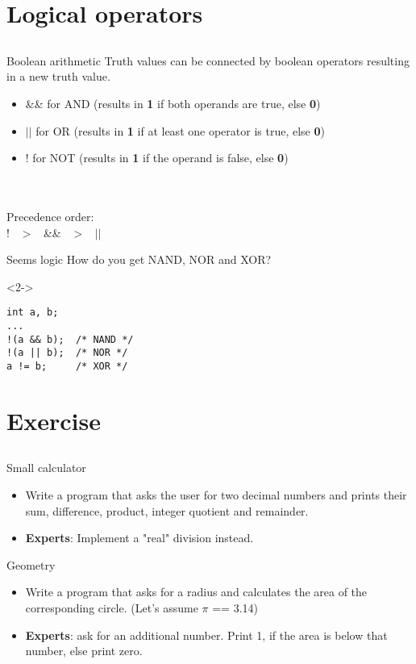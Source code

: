 \section{Logical operators}
\subsection{}
\begin{frame}{Boolean arithmetic}
	Truth values can be connected by boolean operators resulting in a new truth value.
	\begin{itemize}
		\item \&\& for AND (results in \textbf{1} if both operands are true, else \textbf{0})
		\item $||$ for OR (results in \textbf{1} if at least one operator is true, else \textbf{0})
		\item ! for NOT (results in \textbf{1} if the operand is false, else \textbf{0})
	\end{itemize}
	\ \\\ \\Precedence order:\\
	\centering
	! \ $>$ \ \&\& \ $>$ \ $||$ 
\end{frame}
\begin{frame}[fragile]{Seems logic}
	How do you get NAND, NOR and XOR?
	\begin{uncoverenv}<2->
		\begin{lstlisting}[numbers=none]
int a, b;
...
!(a && b);	/* NAND */
!(a || b);	/* NOR */
a != b;		/* XOR */
\end{lstlisting}
	\end{uncoverenv}
\end{frame}
\section{Exercise}
\subsection{}
\begin{frame}{Small calculator}
	\begin{itemize}
		\item Write a program that asks the user for two decimal numbers and prints their sum, difference, product, integer quotient and remainder.
		\item \textbf{Experts}: Implement a "real" division instead.
	\end{itemize}
\end{frame}
\begin{frame}{Geometry}
	\begin{itemize}
		\item Write a program that asks for a radius and calculates the area of the corresponding circle. (Let's assume $\pi$ == 3.14)
		\item \textbf{Experts}: ask for an additional number. Print 1, if the area is below that number, else print zero.
	\end{itemize}
\end{frame}

